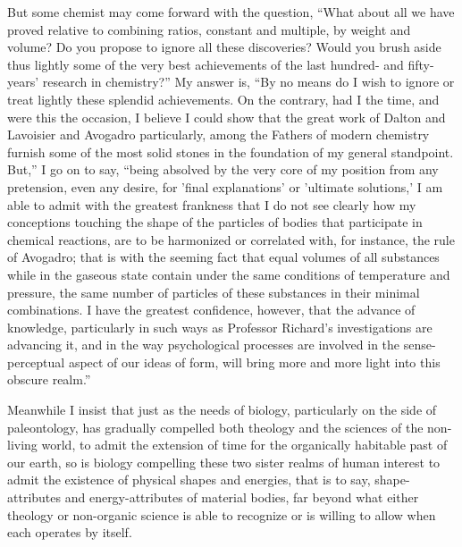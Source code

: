 \documentclass[a4paper, 11pt, oneside, polutonikogreek, english, landscape]{article}
\begin{document}
But some chemist may come forward with the question, ``What about all we have proved relative to combining ratios, constant and multiple, by weight and volume? Do you propose to ignore all these discoveries? Would you brush aside thus lightly some of the very best achievements of the last hundred- and fifty-years’ research in chemistry?'' My answer is, ``By no means do I wish to ignore or treat lightly these splendid achievements. On the contrary, had I the time, and were this the occasion, I believe I could show that the great work of Dalton and Lavoisier and Avogadro particularly, among the Fathers of modern chemistry furnish some of the most solid stones in the foundation of my general standpoint. But,'' I go on to say, ``being absolved by the very core of my position from any pretension, even any desire, for 'final explanations' or 'ultimate solutions,' I am able to admit with the greatest frankness that I do not see clearly how my conceptions touching the shape of the particles of bodies that participate in chemical reactions, are to be harmonized or correlated with, for instance, the rule of Avogadro; that is with the seeming fact that equal volumes of all substances while in the gaseous state contain under the same conditions of temperature and pressure, the same number of particles of these substances in their minimal combinations. I have the greatest confidence, however, that the advance of knowledge, particularly in such ways as Professor Richard's investigations are advancing it, and in the way psychological processes are involved in the sense-perceptual aspect of our ideas of form, will bring more and more light into this obscure realm.''

Meanwhile I insist that just as the needs of biology, particularly on the side of paleontology, has gradually compelled both theology and the sciences of the non-living world, to admit the extension of time for the organically habitable past of our earth, so is biology compelling these two sister realms of human interest to admit the existence of physical shapes and energies, that is to say, shape-attributes and energy-attributes of material bodies, far beyond what either theology or non-organic science is able to recognize or is willing to allow when each operates by itself.

\subsection{}
\end{document}
